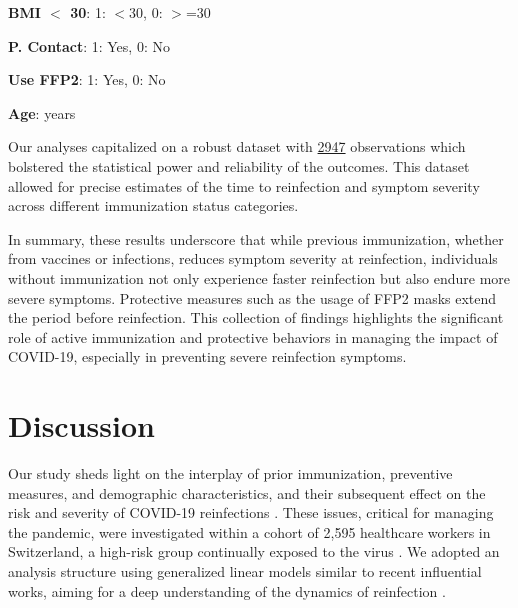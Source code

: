 \documentclass[11pt]{article}
\begin{document}
\begin{table}[h]
\begin{threeparttable}
\begin{tablenotes}
\item \textbf{BMI $<$ 30}: 1: $<$30, 0: $>$=30
\item \textbf{P. Contact}: 1: Yes, 0: No
\item \textbf{Use FFP2}: 1: Yes, 0: No
\item \textbf{Age}: years
\end{tablenotes}
\end{threeparttable}
\end{table}

Our analyses capitalized on a robust dataset with \hyperlink{R0a}{2947} observations which bolstered the statistical power and reliability of the outcomes. This dataset allowed for precise estimates of the time to reinfection and symptom severity across different immunization status categories.

In summary, these results underscore that while previous immunization, whether from vaccines or infections, reduces symptom severity at reinfection, individuals without immunization not only experience faster reinfection but also endure more severe symptoms. Protective measures such as the usage of FFP2 masks extend the period before reinfection. This collection of findings highlights the significant role of active immunization and protective behaviors in managing the impact of COVID-19, especially in preventing severe reinfection symptoms.

\section*{Discussion}

Our study sheds light on the interplay of prior immunization, preventive measures, and demographic characteristics, and their subsequent effect on the risk and severity of COVID-19 reinfections \cite{Pulliam2022IncreasedRO}. These issues, critical for managing the pandemic, were investigated within a cohort of 2,595 healthcare workers in Switzerland, a high-risk group continually exposed to the virus \cite{Slezak2021RateAS}. We adopted an analysis structure using generalized linear models similar to recent influential works, aiming for a deep understanding of the dynamics of reinfection \cite{Loomba2021MeasuringTI, Huang2020GeneralizedAD}.
\end{document}
